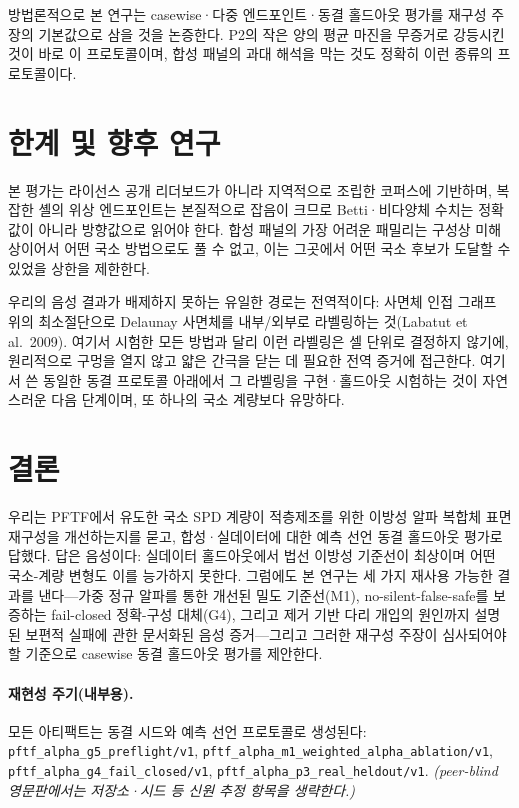\documentclass[11pt]{article}
\begin{document}
방법론적으로 본 연구는 casewise·다중 엔드포인트·동결 홀드아웃 평가를 재구성 주장의 기본값으로 삼을
것을 논증한다. P2의 작은 양의 평균 마진을 무증거로 강등시킨 것이 바로 이 프로토콜이며, 합성 패널의
과대 해석을 막는 것도 정확히 이런 종류의 프로토콜이다.

\section{한계 및 향후 연구}
본 평가는 라이선스 공개 리더보드가 아니라 지역적으로 조립한 코퍼스에 기반하며, 복잡한 셸의 위상
엔드포인트는 본질적으로 잡음이 크므로 Betti·비다양체 수치는 정확값이 아니라 방향값으로 읽어야 한다.
합성 패널의 가장 어려운 패밀리는 구성상 미해상이어서 어떤 국소 방법으로도 풀 수 없고, 이는 그곳에서
어떤 국소 후보가 도달할 수 있었을 상한을 제한한다.

우리의 음성 결과가 배제하지 못하는 유일한 경로는 전역적이다: 사면체 인접 그래프 위의 최소절단으로
Delaunay 사면체를 내부/외부로 라벨링하는 것(Labatut et al.\ 2009). 여기서 시험한 모든 방법과 달리
이런 라벨링은 셀 단위로 결정하지 않기에, 원리적으로 구멍을 열지 않고 얇은 간극을 닫는 데 필요한 전역
증거에 접근한다. 여기서 쓴 동일한 동결 프로토콜 아래에서 그 라벨링을 구현·홀드아웃 시험하는 것이
자연스러운 다음 단계이며, 또 하나의 국소 계량보다 유망하다.

\section{결론}
우리는 PFTF에서 유도한 국소 SPD 계량이 적층제조를 위한 이방성 알파 복합체 표면 재구성을 개선하는지를
묻고, 합성·실데이터에 대한 예측 선언 동결 홀드아웃 평가로 답했다. 답은 음성이다: 실데이터 홀드아웃에서
법선 이방성 기준선이 최상이며 어떤 국소-계량 변형도 이를 능가하지 못한다. 그럼에도 본 연구는 세 가지
재사용 가능한 결과를 낸다---가중 정규 알파를 통한 개선된 밀도 기준선(M1), no-silent-false-safe를
보증하는 fail-closed 정확-구성 대체(G4), 그리고 제거 기반 다리 개입의 원인까지 설명된 보편적 실패에
관한 문서화된 음성 증거---그리고 그러한 재구성 주장이 심사되어야 할 기준으로 casewise 동결 홀드아웃
평가를 제안한다.

\paragraph{재현성 주기(내부용).} 모든 아티팩트는 동결 시드와 예측 선언 프로토콜로 생성된다:
\texttt{pftf\_alpha\_g5\_preflight/v1}, \texttt{pftf\_alpha\_m1\_weighted\_alpha\_ablation/v1},
\texttt{pftf\_alpha\_g4\_fail\_closed/v1}, \texttt{pftf\_alpha\_p3\_real\_heldout/v1}.
\emph{(peer-blind 영문판에서는 저장소·시드 등 신원 추정 항목을 생략한다.)}
\end{document}
